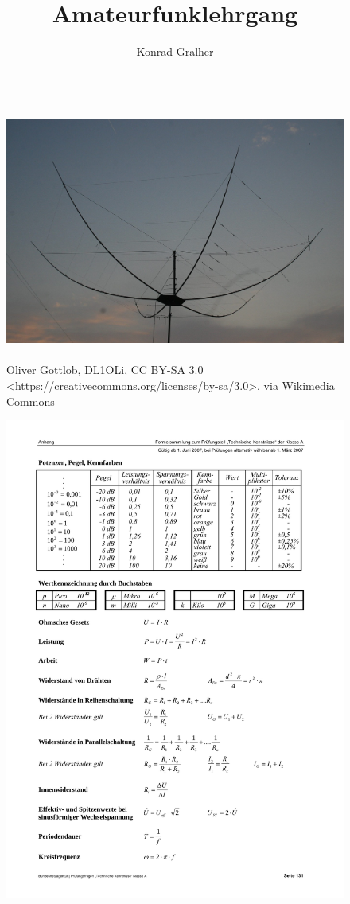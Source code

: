 \documentclass[fontzize=12pt,paper=a4,twoside=false]{article}
\title{Amateurfunklehrgang}
\author{Konrad Gralher}
\begin{document}
{\bfseries\Huge{}
\begin{figure}
    \includegraphics[height=320px]{assets/Hexbeam_dl1oli_k.jpg}
    \caption{Oliver Gottlob, DL1OLi, CC BY-SA 3.0 <https://creativecommons.org/licenses/by-sa/3.0>, via Wikimedia Commons}  
\end{figure}}
\tableofcontents


\begin{figure}
    \includegraphics{Formelsammlung_A.pdf}
\end{figure}
\end{document}
